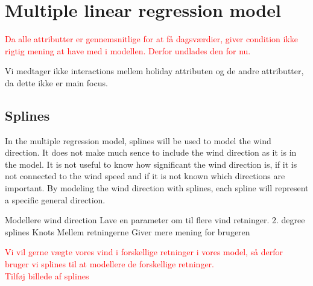 \section{Multiple linear regression model}

\textcolor{red}{Da alle attributter er gennemsnitlige for at få dagsværdier, giver condition ikke rigtig mening at have med i modellen. Derfor undlades den for nu.}

Vi medtager ikke interactions mellem holiday attributen og de andre attributter, da dette ikke er main focus.

\subsection{Splines}
In the multiple regression model, splines will be used to model the wind direction. It does not make much sence to include the wind direction as it is in the model. It is not useful to know how significant the wind direction is, if it is not connected to the wind speed and if it is not known which directions are important. By modeling the wind direction with splines, each spline will represent a specific general direction.

Modellere wind direction
Lave en parameter om til flere vind retninger.
2. degree splines
Knots
Mellem retningerne
Giver mere mening for brugeren

\textcolor{red}{Vi vil gerne vægte vores vind i forskellige retninger i vores model, så derfor bruger vi splines til at modellere de forskellige retninger.} \\

\textcolor{red}{Tilføj billede af splines}



